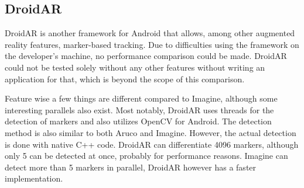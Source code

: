 \subsection{DroidAR}

DroidAR\cite{droidar} is another framework for Android that allows, among other augmented reality features, marker-based tracking.
Due to difficulties using the framework on the developer's machine, no performance comparison could be made.
DroidAR could not be tested solely without any other features without writing an application for that, which is beyond the scope of this comparison.

Feature wise a few things are different compared to Imagine, although some interesting parallels also exist.
Most notably, DroidAR uses threads for the detection of markers and also utilizes OpenCV for Android.
The detection method is also similar to both Aruco and Imagine.
However, the actual detection is done with native C++ code.
DroidAR can differentiate 4096 markers, although only 5 can be detected at once, probably for performance reasons.
Imagine can detect more than 5 markers in parallel, DroidAR however has a faster implementation.
